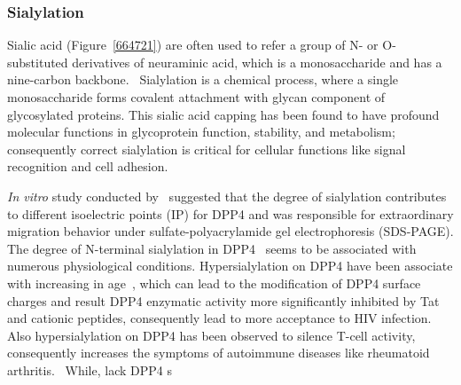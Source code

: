 \subsubsection {Sialylation}
Sialic acid (Figure~\ref{664721}) are often used to refer a group of N- or O-substituted derivatives of neuraminic acid, which is a monosaccharide and has a nine-carbon backbone.~\cite{Vocadlo_2009} Sialylation is a chemical process, where a single monosaccharide forms covalent attachment with glycan component of glycosylated proteins. This sialic acid capping has been found to have profound molecular functions in glycoprotein function, stability, and metabolism; consequently correct sialylation is critical for cellular functions like signal recognition and cell adhesion.~\cite{Bhide_2016}
\par 
\textit{In vitro} study conducted by~\citet{Schmauser1999} suggested that the degree of sialylation contributes to different isoelectric points (IP) for DPP4 and was responsible for extraordinary migration behavior under sulfate-polyacrylamide gel electrophoresis (SDS-PAGE). 
The degree of N-terminal sialylation in DPP4~\cite{Stehling_1999} seems to be associated with numerous physiological conditions. Hypersialylation on DPP4 have been associate with increasing in age~\cite{SMITH_1998}, which can lead to the modification of DPP4 surface charges and result DPP4 enzymatic activity more significantly inhibited by Tat and cationic peptides, consequently lead to more acceptance to HIV infection.~\cite{SMITH_1998} Also hypersialylation on DPP4 has been observed to silence T-cell activity, consequently increases the symptoms of autoimmune diseases like rheumatoid arthritis.~\cite{Cuchacovich2001}  
While, lack DPP4 s
\cite{K_hne_1996} 
